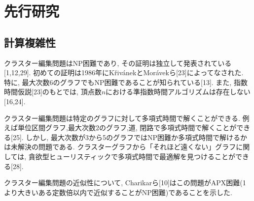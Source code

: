 \documentclass[10.5,a4paper,titlepage, dvipdfmx]{bxjsarticle}
\begin{document}
\section{先行研究}
\subsection{計算複雑性}
クラスター編集問題はNP困難であり, その証明は独立して発表されている[1,12,29].
初めての証明は1986年にKřivánekとMorávekら[23]によってなされた.
特に, 最大次数6のグラフでもNP困難であることが知られている[13].
また, 指数時間仮説[23]のもとでは, 頂点数$n$における準指数時間アルゴリズムは存在しない[16,24].\par

クラスター編集問題は特定のグラフに対して多項式時間で解くことができる.
例えば単位区間グラフ,最大次数2のグラフ,道, 閉路で多項式時間で解くことができる[25].
しかし, 最大次数が3から5のグラフではNP困難か多項式時間で解けるかは未解決の問題である.
クラスターグラフから「それほど遠くない」グラフに関しては, 貪欲型ヒューリスティックで多項式時間で最適解を見つけることができる[28].\par
クラスター編集問題の近似性について, Charikarら[10]はこの問題がAPX困難(1より大きいある定数倍以内で近似することがNP困難)であることを示した.
\end{document}

